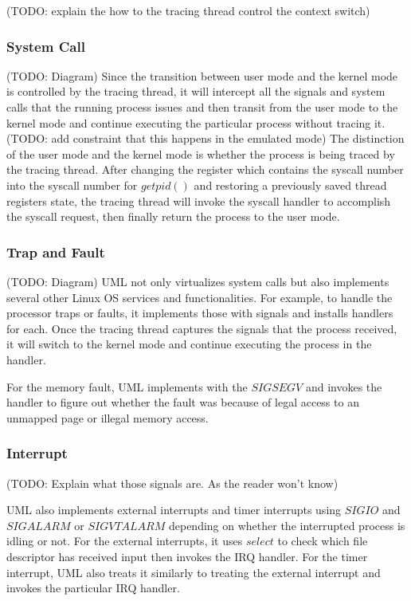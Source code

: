 (TODO: explain the how to the tracing thread control the context switch)

\subsubsection{System Call}

(TODO: Diagram)
Since the transition between user mode and the kernel mode is controlled by the tracing thread, it will intercept all the signals and system calls that the running process issues and then transit from the user mode to the kernel mode and continue executing the particular process without tracing it. (TODO: add constraint that this happens in the emulated mode) The distinction of the user mode and the kernel mode is whether the process is being traced by the tracing thread. After changing the register which contains the syscall number into the syscall number for $getpid()$ and restoring a previously saved thread registers state, the tracing thread will invoke the syscall handler to accomplish the syscall request, then finally return the process to the user mode. 

\subsubsection{Trap and Fault}

(TODO: Diagram)
UML not only virtualizes system calls but also implements several other Linux OS services and functionalities. For example, to handle the processor traps or faults, it implements those with signals and installs handlers for each. Once the tracing thread captures the signals that the process received, it will switch to the kernel mode and continue executing the process in the handler.

For the memory fault, UML implements with the $SIGSEGV$ and invokes the handler to figure out whether the fault was because of legal access to an unmapped page or illegal memory access. 

\subsubsection{Interrupt}

(TODO: Explain what those signals are. As the reader won't know)

UML also implements external interrupts and timer interrupts using $SIGIO$ and $SIGALARM$ or $SIGVTALARM$ depending on whether the interrupted process is idling or not. For the external interrupts, it uses $select$ to check which file descriptor has received input then invokes the IRQ handler. For the timer interrupt, UML also treats it similarly to treating the external interrupt and invokes the particular IRQ handler. 

